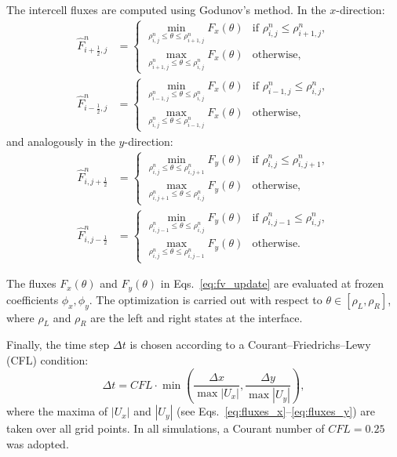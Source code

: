 \documentclass{article}
\begin{document}
The intercell fluxes are computed using Godunov's method. In the \(x\)-direction:
\begin{align}
\hat{F}^n_{i+\frac{1}{2},j} &=
\begin{cases}
\min\limits_{\rho^n_{i,j} \leq \theta \leq \rho^n_{i+1,j}} F_x(\theta) & \text{if } \rho^n_{i,j} \leq \rho^n_{i+1,j}, \\
\max\limits_{\rho^n_{i+1,j} \leq \theta \leq \rho^n_{i,j}} F_x(\theta) & \text{otherwise},
\end{cases} \\
\hat{F}^n_{i-\frac{1}{2},j} &=
\begin{cases}
\min\limits_{\rho^n_{i-1,j} \leq \theta \leq \rho^n_{i,j}} F_x(\theta) & \text{if } \rho^n_{i-1,j} \leq \rho^n_{i,j}, \\
\max\limits_{\rho^n_{i,j} \leq \theta \leq \rho^n_{i-1,j}} F_x(\theta) & \text{otherwise},
\end{cases}
\end{align}
and analogously in the \(y\)-direction:
\begin{align}
\hat{F}^n_{i,j+\frac{1}{2}} &=
\begin{cases}
\min\limits_{\rho^n_{i,j} \leq \theta \leq \rho^n_{i,j+1}} F_y(\theta) & \text{if } \rho^n_{i,j} \leq \rho^n_{i,j+1}, \\
\max\limits_{\rho^n_{i,j+1} \leq \theta \leq \rho^n_{i,j}} F_y(\theta) & \text{otherwise},
\end{cases} \\
\hat{F}^n_{i,j-\frac{1}{2}} &=
\begin{cases}
\min\limits_{\rho^n_{i,j-1} \leq \theta \leq \rho^n_{i,j}} F_y(\theta) & \text{if } \rho^n_{i,j-1} \leq \rho^n_{i,j}, \\
\max\limits_{\rho^n_{i,j} \leq \theta \leq \rho^n_{i,j-1}} F_y(\theta) & \text{otherwise}.
\end{cases}
\end{align}

The fluxes \( F_x(\theta) \) and \( F_y(\theta) \) in Eqs.~\eqref{eq:fv_update} are evaluated at frozen coefficients \( \phi_x, \phi_y \). The optimization is carried out with respect to \( \theta \in [\rho_L,\rho_R] \), where \( \rho_L \) and \( \rho_R \) are the left and right states at the interface.

Finally, the time step $\Delta t$ is chosen according to a Courant--Friedrichs--Lewy (CFL) condition:
\begin{equation}
\Delta t = CFL \cdot \min \left( \frac{\Delta x}{\max |U_x|}, \frac{\Delta y}{\max |U_y|} \right),
\end{equation}
where the maxima of $|U_x|$ and $|U_y|$ (see Eqs.~\eqref{eq:fluxes_x}--\eqref{eq:fluxes_y}) are taken over all grid points. In all simulations, a Courant number of $CFL = 0.25$ was adopted.
\end{document}
